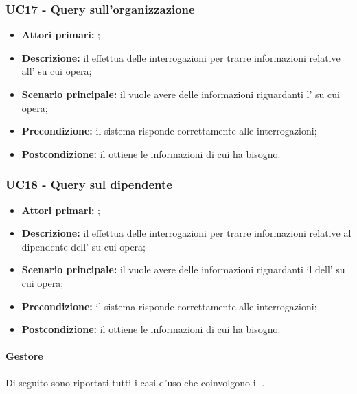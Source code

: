\documentclass[casi-duso]{subfiles}
\begin{document}
\subsubsection{UC17 - Query sull'organizzazione}
\label{subsub:UC17}
\begin{itemize}
  \item \textbf{Attori primari:} ;
  \item \textbf{Descrizione:} il  effettua delle interrogazioni per trarre informazioni relative all' su cui opera;
  \item \textbf{Scenario principale:} il  vuole avere delle informazioni riguardanti l' su cui opera;
  \item \textbf{Precondizione:} il sistema risponde correttamente alle interrogazioni;
  \item \textbf{Postcondizione:} il  ottiene le informazioni di cui ha bisogno.
\end{itemize}

\subsubsection{UC18 - Query sul dipendente}
\label{subsub:UC18}
\begin{itemize}
  \item \textbf{Attori primari:} ;
  \item \textbf{Descrizione:} il  effettua delle interrogazioni per trarre informazioni relative al dipendente dell' su cui opera;
  \item \textbf{Scenario principale:} il  vuole avere delle informazioni riguardanti il dell' su cui opera;
  \item \textbf{Precondizione:} il sistema risponde correttamente alle interrogazioni;
  \item \textbf{Postcondizione:} il  ottiene le informazioni di cui ha bisogno.
\end{itemize}

\paragraph{Gestore}
Di seguito sono riportati tutti i casi d'uso che coinvolgono il  .
\end{document}
